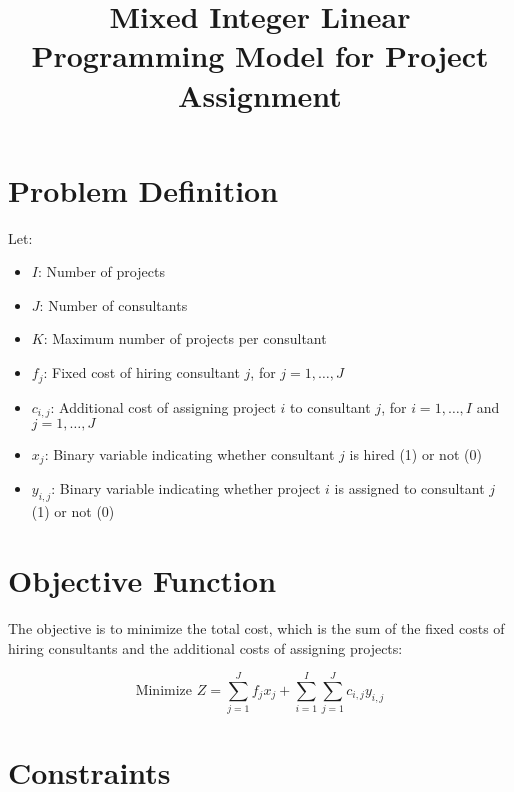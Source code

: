 \documentclass{article}
\begin{document}
\title{Mixed Integer Linear Programming Model for Project Assignment}
\author{}
\date{}
\maketitle

\section*{Problem Definition}

Let:
\begin{itemize}
    \item $I$: Number of projects
    \item $J$: Number of consultants
    \item $K$: Maximum number of projects per consultant
    \item $f_j$: Fixed cost of hiring consultant $j$, for $j = 1, \ldots, J$
    \item $c_{i,j}$: Additional cost of assigning project $i$ to consultant $j$, for $i = 1, \ldots, I$ and $j = 1, \ldots, J$
    \item $x_{j}$: Binary variable indicating whether consultant $j$ is hired (1) or not (0)
    \item $y_{i,j}$: Binary variable indicating whether project $i$ is assigned to consultant $j$ (1) or not (0)
\end{itemize}

\section*{Objective Function}

The objective is to minimize the total cost, which is the sum of the fixed costs of hiring consultants and the additional costs of assigning projects:

\[
\text{Minimize } Z = \sum_{j=1}^{J} f_j x_j + \sum_{i=1}^{I} \sum_{j=1}^{J} c_{i,j} y_{i,j}
\]

\section*{Constraints}
\end{document}
